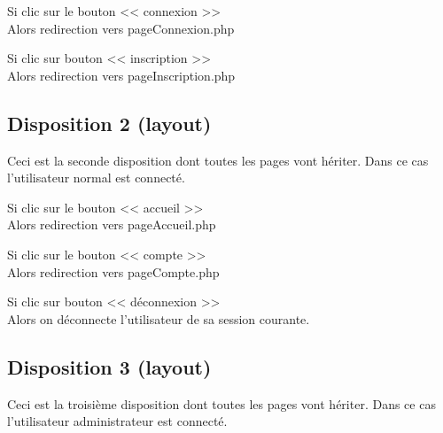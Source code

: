 		\begin{paragraphe}
			Si clic sur le bouton << connexion >> \\
			Alors redirection vers pageConnexion.php
		\end{paragraphe}

		\begin{paragraphe}
			Si clic sur bouton << inscription >> \\
			Alors redirection vers pageInscription.php
		\end{paragraphe}


	\subsection{Disposition 2 (layout)}

		\begin{paragraphe}
			Ceci est la seconde disposition dont toutes les pages vont hériter. Dans ce cas l'utilisateur normal est connecté.
		\end{paragraphe}

		\begin{paragraphe}
			Si clic sur le bouton << accueil >> \\
			Alors redirection vers pageAccueil.php
		\end{paragraphe}

		\begin{paragraphe}
			Si clic sur le bouton << compte >> \\
			Alors redirection vers pageCompte.php
		\end{paragraphe}

		\begin{paragraphe}
			Si clic sur bouton << déconnexion >> \\
			Alors on déconnecte l'utilisateur de sa session courante.
		\end{paragraphe}


	\subsection{Disposition 3 (layout)}

		\begin{paragraphe}
			Ceci est la troisième disposition dont toutes les pages vont hériter. Dans ce cas l'utilisateur administrateur est connecté.
		\end{paragraphe}

